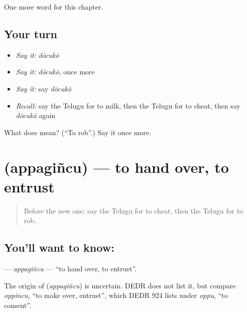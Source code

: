 \begin{grammarlens}[title={What you've built}]
One more word for this chapter.
\end{grammarlens}

\subsection*{Your turn}
\begin{itemize}
\raggedright
  \item \emph{Say it:} \emph{dōcukō}
  \item \emph{Say it:} \emph{dōcukō}, once more
  \item \emph{Say it:} say \emph{dōcukō}
  \item \emph{Recall:} say the Telugu for to milk, then the Telugu for to cheat, then say \emph{dōcukō} again
\end{itemize}

\begin{tcolorbox}[breakable,colback=teal!4,colframe=teal!35!black,title={Before you move on}]
What does  mean? (\textquotedblleft{}To rob\textquotedblright{}.) Say it once more.
\end{tcolorbox}
\section[\texorpdfstring{\te{అప్పగించు} (appagiñcu)}{అప్పగించు (appagiñcu)}]{ (appagiñcu) — to hand over, to entrust}

\label{lesson:TE-C248-appagincu}



\begin{quote}
Before the new one: say the Telugu for to cheat, then the Telugu for to rob.
\end{quote}

\subsection*{You'll want to know: }
\textbf{} — \emph{appagiñcu} — \textquotedblleft{}to hand over, to entrust\textquotedblright{}.

\begin{cousinweb}
The origin of \textbf{} (\emph{appagiñcu}) is uncertain. DEDR does not list it, but compare \emph{oppincu}, \textquotedblleft{}to make over, entrust\textquotedblright{}, which DEDR 924 lists under \emph{oppu}, \textquotedblleft{}to consent\textquotedblright{}.
\end{cousinweb}


